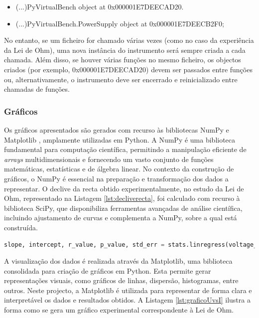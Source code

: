 \begin{itemize}
	\item (...)PyVirtualBench object at 0x000001E7DEECAD20.
	\item (...)PyVirtualBench.PowerSupply object at 0x000001E7DEECB2F0;
\end{itemize}

No entanto, se um ficheiro for chamado várias vezes (como no caso da experiência da Lei de Ohm), uma nova instância do instrumento será sempre criada a cada chamada. Além disso, se houver várias funções no mesmo ficheiro, os objectos criados (por exemplo, 0x000001E7DEECAD20) devem ser passados entre funções ou, alternativamente, o instrumento deve ser encerrado e reinicializado entre chamadas de funções.

\subsubsection{Gráficos}
\label{sec:graficos}
Os gráficos apresentados são gerados com recurso às bibliotecas NumPy \cite{NumPy} e Matplotlib \cite{Matplotlib}, amplamente utilizadas em Python. A NumPy é uma biblioteca fundamental para computação científica, permitindo a manipulação eficiente de \textit{arrays} multidimensionais e fornecendo um vasto conjunto de funções matemáticas, estatísticas e de álgebra linear. No contexto da construção de gráficos, o NumPy é essencial na preparação e transformação dos dados a representar. O declive da recta obtido experimentalmente, no estudo da Lei de Ohm, representado na Listagem \ref{lst:decliverecta}, foi calculado com recurso à biblioteca SciPy, que disponibiliza ferramentas avançadas de análise científica, incluindo ajustamento de curvas e complementa a NumPy, sobre a qual está construída.

\begin{minipage}{0.9\linewidth}
	\begin{lstlisting}[language=Python,escapechar=|, caption=Cálculo do declive da recta, label=lst:decliverecta]
		slope, intercept, r_value, p_value, std_err = stats.linregress(voltage_measurements, current_measurements)
	\end{lstlisting}
\end{minipage}

A visualização dos dados é realizada através da Matplotlib, uma biblioteca consolidada para criação de gráficos em Python. Esta permite gerar representações visuais, como gráficos de linhas, dispersão, histogramas, entre outros. Neste projecto, a Matplotlib é utilizada para representar de forma clara e interpretável os dados e resultados obtidos. A Listagem \ref{lst:graficoUvsI} ilustra a forma como se gera um gráfico experimental correspondente à Lei de Ohm.

